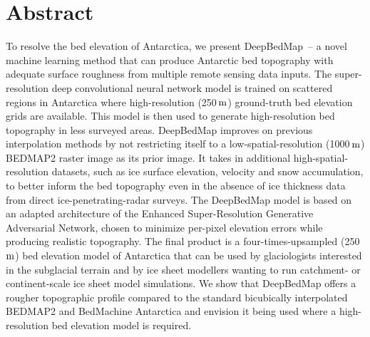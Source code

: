 
\DeclareRobustCommand*\unit[1]
 {\ensuremath{%
   {\thinmuskip3mu\relax
    \def\mu{\text{\textmu}}\def~{\,}%
    \ifx\f@series\testbx\mathbf{#1}\else\mathrm{#1}\fi}}}
\newcommand\tophline{\hline\noalign{\vspace{1mm}}}
\newcommand\middlehline{\noalign{\vspace{1mm}}\hline\noalign{\vspace{1mm}}}
\newcommand\bottomhline{\noalign{\vspace{1mm}}\hline}

\section*{Abstract}

To resolve the bed elevation of Antarctica, we present DeepBedMap~-- a novel machine learning method that can produce Antarctic bed topography with adequate surface roughness from multiple remote sensing data inputs.
The super-resolution deep convolutional neural network model is trained on scattered regions in Antarctica where high-resolution (250\,\unit{m}) ground-truth bed elevation grids are available.
This model is then used to generate high-resolution bed topography in less surveyed areas.
DeepBedMap improves on previous interpolation methods by not restricting itself to a low-spatial-resolution (1000\,\unit{m}) BEDMAP2 raster image as its prior image.
It takes in additional high-spatial-resolution datasets, such as ice surface elevation, velocity and snow accumulation, to better inform the bed topography even in the absence of ice thickness data from direct ice-penetrating-radar surveys.
The DeepBedMap model is based on an adapted architecture of the Enhanced Super-Resolution Generative Adversarial Network, chosen to minimize per-pixel elevation errors while producing realistic topography.
The final product is a four-times-upsampled (250\,\unit{m}) bed elevation model of Antarctica that can be used by glaciologists interested in the subglacial terrain and by ice sheet modellers wanting to run catchment- or continent-scale ice sheet model simulations.
We show that DeepBedMap offers a rougher topographic profile compared to the standard bicubically interpolated BEDMAP2 and BedMachine Antarctica and envision it being used where a high-resolution bed elevation model is required.

